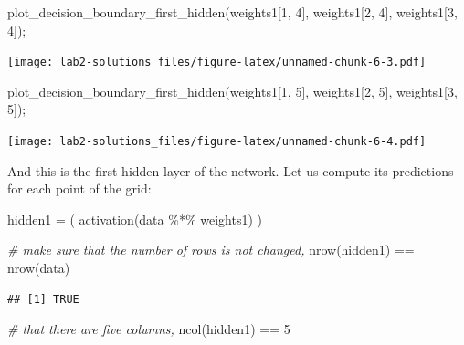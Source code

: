 \documentclass[
]{article}
\newenvironment{Shaded}{\begin{snugshade}}{\end{snugshade}}
\newcommand{\CommentTok}[1]{\textcolor[rgb]{0.56,0.35,0.01}{\textit{#1}}}
\newcommand{\DecValTok}[1]{\textcolor[rgb]{0.00,0.00,0.81}{#1}}
\newcommand{\FunctionTok}[1]{\textcolor[rgb]{0.00,0.00,0.00}{#1}}
\newcommand{\NormalTok}[1]{#1}
\newcommand{\OtherTok}[1]{\textcolor[rgb]{0.56,0.35,0.01}{#1}}
\newcommand{\SpecialCharTok}[1]{\textcolor[rgb]{0.00,0.00,0.00}{#1}}
\begin{document}
\begin{Shaded}
\begin{Highlighting}[]
\FunctionTok{plot\_decision\_boundary\_first\_hidden}\NormalTok{(weights1[}\DecValTok{1}\NormalTok{, }\DecValTok{4}\NormalTok{], weights1[}\DecValTok{2}\NormalTok{, }\DecValTok{4}\NormalTok{], weights1[}\DecValTok{3}\NormalTok{, }\DecValTok{4}\NormalTok{]);}
\end{Highlighting}
\end{Shaded}

\texttt{[image: lab2-solutions\_files/figure-latex/unnamed-chunk-6-3.pdf]}

\begin{Shaded}
\begin{Highlighting}[]
\FunctionTok{plot\_decision\_boundary\_first\_hidden}\NormalTok{(weights1[}\DecValTok{1}\NormalTok{, }\DecValTok{5}\NormalTok{], weights1[}\DecValTok{2}\NormalTok{, }\DecValTok{5}\NormalTok{], weights1[}\DecValTok{3}\NormalTok{, }\DecValTok{5}\NormalTok{]);}
\end{Highlighting}
\end{Shaded}

\texttt{[image: lab2-solutions\_files/figure-latex/unnamed-chunk-6-4.pdf]}

And this is the first hidden layer of the network. Let us compute its
predictions for each point of the grid:

\begin{Shaded}
\begin{Highlighting}[]
\NormalTok{hidden1 }\OtherTok{=}\NormalTok{ (}
  \FunctionTok{activation}\NormalTok{(data }\SpecialCharTok{\%*\%}\NormalTok{ weights1)}
\NormalTok{)}

\CommentTok{\# make sure that the number of rows is not changed,}
\FunctionTok{nrow}\NormalTok{(hidden1) }\SpecialCharTok{==} \FunctionTok{nrow}\NormalTok{(data)}
\end{Highlighting}
\end{Shaded}

\begin{verbatim}
## [1] TRUE
\end{verbatim}

\begin{Shaded}
\begin{Highlighting}[]
\CommentTok{\# that there are five columns,}
\FunctionTok{ncol}\NormalTok{(hidden1) }\SpecialCharTok{==} \DecValTok{5}
\end{Highlighting}
\end{Shaded}
\end{document}
